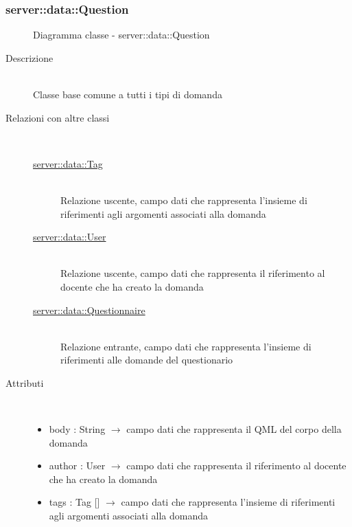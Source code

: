 \vspace{0.5cm}
\hypertarget{server::data::Question}{}
\subsubsection[Question]{server::data::Question}
\begin{figure}[H]
	\centering
	\caption{Diagramma classe - server::data::Question}
\end{figure}\begin{description}
\item[Descrizione] \hfill \\
Classe base comune a tutti i tipi di domanda
\item[Relazioni con altre classi] \hfill \\
\vspace{-7mm}
\begin{description}
	\item[\hyperlink{server::data::Tag}{server::data::Tag}] \hfill \\
	Relazione uscente, campo dati che rappresenta l'insieme di riferimenti agli argomenti associati alla domanda
	\item[\hyperlink{server::data::User}{server::data::User}] \hfill \\
	Relazione uscente, campo dati che rappresenta il riferimento al docente che ha creato la domanda
	\item[\hyperlink{server::data::Questionnaire}{server::data::Questionnaire}] \hfill \\
	Relazione entrante, campo dati che rappresenta l'insieme di riferimenti alle domande del questionario
\end{description}

\item[Attributi] \hfill \\
\vspace{-7mm}
\begin{itemize}
	\item body : String $\rightarrow$ campo dati che rappresenta il QML del corpo della domanda
	\item author : User $\rightarrow$ campo dati che rappresenta il riferimento al docente che ha creato la domanda
	\item tags : Tag [] $\rightarrow$ campo dati che rappresenta l'insieme di riferimenti agli argomenti associati alla domanda
\end{itemize}


\end{description}
